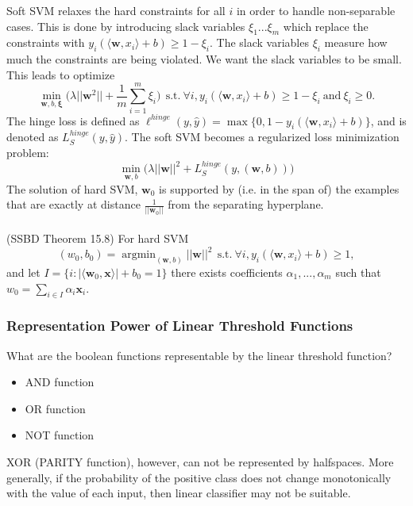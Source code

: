 \documentclass{article}
\begin{document}
   Soft SVM relaxes the hard constraints for all $i$ in order to handle non-separable cases. This is done by introducing slack variables $\xi_1...\xi_m$ which replace the constraints with $y_i(\langle \textbf{w}, x_i \rangle + b) \geq 1 - \xi_i$. The slack variables $\xi_i$ measure how much the constraints are being violated. We want the slack variables to be small. This leads to optimize
   \begin{equation}
   \min_{\mathbf{w}, b, \mathbf{\xi}} \Bigg( \lambda ||\mathbf{w}^2|| + \frac{1}{m} \sum_{i=1}^m \xi_i \Bigg) \ \ 
   \text{s.t.} \ \forall i, y_i(\langle \textbf{w}, x_i \rangle + b) \geq 1 - \xi_i\ \text{and}\ \xi_i \geq 0.
   \end{equation}
   The hinge loss is defined as $\ell^{hinge} (y, \hat{y}) = \max \{ 0, 1-y_i(\langle \textbf{w}, x_i \rangle + b) \}$, and is denoted as $L_S^{hinge}(y,\hat{y})$. The soft SVM becomes a regularized loss minimization problem:
   \begin{equation}
   \min_{\mathbf{w},b} \Bigg( \lambda||\mathbf{w}||^2 + L_S^{hinge}(y, (\mathbf{w}, b)) \Bigg)
   \end{equation}
   The solution of hard SVM, $\mathbf{w}_0$ is supported by (i.e. in the span of) the examples that are exactly at distance $\frac{1}{||\mathbf{w}_0||}$ from the separating hyperplane.
   \\\\
   (SSBD Theorem 15.8) For hard SVM
   \begin{equation}
   (w_0, b_0) = \mathop{\arg \min}_{(\mathbf{w}, b)} ||\mathbf{w}||^2\ \ \text{s.t.}\  \forall i, y_i(\langle \textbf{w}, x_i \rangle + b) \geq 1,
   \end{equation}
   and let $I = \{ i:|\langle \mathbf{w}_0, \mathbf{x}\rangle| + b_0 = 1 \}$ there exists coefficients $\alpha_1,...,\alpha_m$ such that $w_0 = \sum_{i \in I} \alpha_i \mathbf{x}_i$.
   
   \subsubsection{Representation Power of Linear Threshold Functions}
   What are the boolean functions representable by the linear threshold function?
   \begin{itemize}
   \item AND function
   \item OR function
   \item NOT function
   \end{itemize}
   XOR (PARITY function), however, can not be represented by halfspaces. More generally, if the probability of the positive class does not change monotonically with the value of each input, then linear classifier may not be suitable.
   
\end{document}
